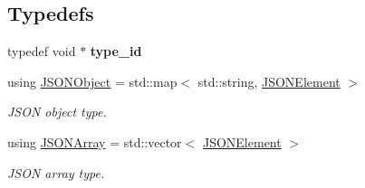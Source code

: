 \subsection*{Typedefs}
\begin{DoxyCompactItemize}
\item 
\hypertarget{namespace_simple_j_s_o_n_ab2cec6f8e5b814f244db801d29975818}{typedef void $\ast$ {\bfseries type\+\_\+id}}\label{namespace_simple_j_s_o_n_ab2cec6f8e5b814f244db801d29975818}

\item 
\hypertarget{namespace_simple_j_s_o_n_af08971ebbb6e72577450a7b8bde7f143}{using \hyperlink{namespace_simple_j_s_o_n_af08971ebbb6e72577450a7b8bde7f143}{J\+S\+O\+N\+Object} = std\+::map$<$ std\+::string, \hyperlink{class_simple_j_s_o_n_1_1_j_s_o_n_element}{J\+S\+O\+N\+Element} $>$}\label{namespace_simple_j_s_o_n_af08971ebbb6e72577450a7b8bde7f143}

\begin{DoxyCompactList}\small\item\em J\+S\+O\+N object type. \end{DoxyCompactList}\item 
\hypertarget{namespace_simple_j_s_o_n_ad092eb41ea5d146a50606e14e4611c6b}{using \hyperlink{namespace_simple_j_s_o_n_ad092eb41ea5d146a50606e14e4611c6b}{J\+S\+O\+N\+Array} = std\+::vector$<$ \hyperlink{class_simple_j_s_o_n_1_1_j_s_o_n_element}{J\+S\+O\+N\+Element} $>$}\label{namespace_simple_j_s_o_n_ad092eb41ea5d146a50606e14e4611c6b}

\begin{DoxyCompactList}\small\item\em J\+S\+O\+N array type. \end{DoxyCompactList}\end{DoxyCompactItemize}

